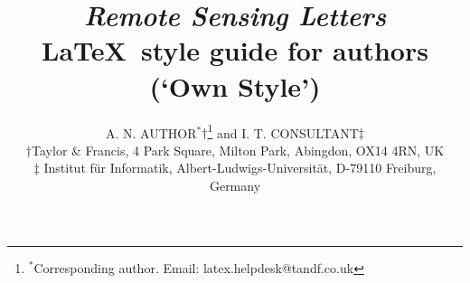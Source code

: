 \documentclass[]{tRSL2e}
\begin{document}
   


\title{{\em{Remote Sensing Letters}} \break \LaTeX\ style guide
for authors (`Own Style')}

\author{A. N. AUTHOR$^{\ast}$$\dag$\thanks{$^\ast$Corresponding
author. Email: latex.helpdesk@tandf.co.uk \vspace{6pt}} and I. T.
CONSULTANT${\ddag}$\\
\vspace{6pt} $\dag$Taylor \& Francis, 4 Park Square, Milton Park,
Abingdon, OX14 4RN, UK\\
$\ddag$ Institut f\"{u}r Informatik, Albert-Ludwigs-Universit\"{a}t,
D-79110 Freiburg, Germany\\
\vspace{6pt} }

\maketitle
\end{document}

